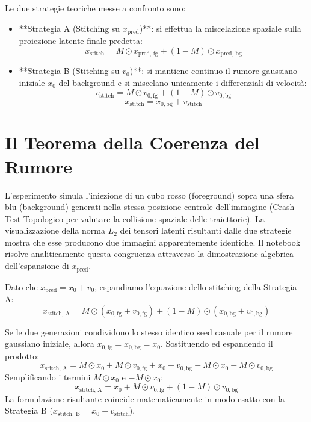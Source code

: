 \documentclass[12pt,a4paper]{report}
\begin{document}
Le due strategie teoriche messe a confronto sono:
\begin{itemize}
    \item **Strategia A (Stitching su $x_{\text{pred}}$)**: si effettua la miscelazione spaziale sulla proiezione latente finale predetta:
    \begin{equation}
        x_{\text{stitch}} = M \odot x_{\text{pred, fg}} + (1 - M) \odot x_{\text{pred, bg}}
    \end{equation}
    \item **Strategia B (Stitching su $v_0$)**: si mantiene continuo il rumore gaussiano iniziale $x_0$ del background e si miscelano unicamente i differenziali di velocità:
    \begin{equation}
        v_{\text{stitch}} = M \odot v_{0, \text{fg}} + (1 - M) \odot v_{0, \text{bg}}
    \end{equation}
    \begin{equation}
        x_{\text{stitch}} = x_{0, \text{bg}} + v_{\text{stitch}}
    \end{equation}
\end{itemize}

\section{Il Teorema della Coerenza del Rumore}
L'esperimento simula l'iniezione di un cubo rosso (foreground) sopra una sfera blu (background) generati nella stessa posizione centrale dell'immagine (Crash Test Topologico per valutare la collisione spaziale delle traiettorie). 
La visualizzazione della norma $L_2$ dei tensori latenti risultanti dalle due strategie mostra che esse producono due immagini apparentemente identiche. Il notebook risolve analiticamente questa congruenza attraverso la dimostrazione algebrica dell'espansione di $x_{\text{pred}}$.

Dato che $x_{\text{pred}} = x_0 + v_0$, espandiamo l'equazione dello stitching della Strategia A:
\begin{equation}
    x_{\text{stitch, A}} = M \odot (x_{0, \text{fg}} + v_{0, \text{fg}}) + (1 - M) \odot (x_{0, \text{bg}} + v_{0, \text{bg}})
\end{equation}

Se le due generazioni condividono lo stesso identico seed casuale per il rumore gaussiano iniziale, allora $x_{0, \text{fg}} = x_{0, \text{bg}} = x_0$. Sostituendo ed espandendo il prodotto:
\begin{equation}
    x_{\text{stitch, A}} = M \odot x_0 + M \odot v_{0, \text{fg}} + x_0 + v_{0, \text{bg}} - M \odot x_0 - M \odot v_{0, \text{bg}}
\end{equation}
Semplificando i termini $M \odot x_0$ e $- M \odot x_0$:
\begin{equation}
    x_{\text{stitch, A}} = x_0 + M \odot v_{0, \text{fg}} + (1 - M) \odot v_{0, \text{bg}}
\end{equation}
La formulazione risultante coincide matematicamente in modo esatto con la Strategia B ($x_{\text{stitch, B}} = x_0 + v_{\text{stitch}}$).
\end{document}
